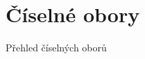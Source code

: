 \clearpage

\section{Číselné obory}
\label{sec:zaklady-ciselne-obory}

\begin{table}[!ht]
    \centering
    
    \caption{Přehled číselných oborů}
    \label{tab:table}
\end{table}